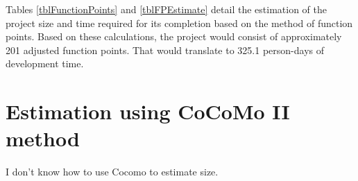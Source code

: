 Tables \ref{tblFunctionPoints} and \ref{tblFPEstimate} detail the estimation of the project size and time required for its completion based on the method of function points. Based on these calculations, the project would consist of approximately 201 adjusted function points. That would translate to 325.1 person-days of development time.

\section{Estimation using CoCoMo II method}

I don't know how to use Cocomo to estimate size.

